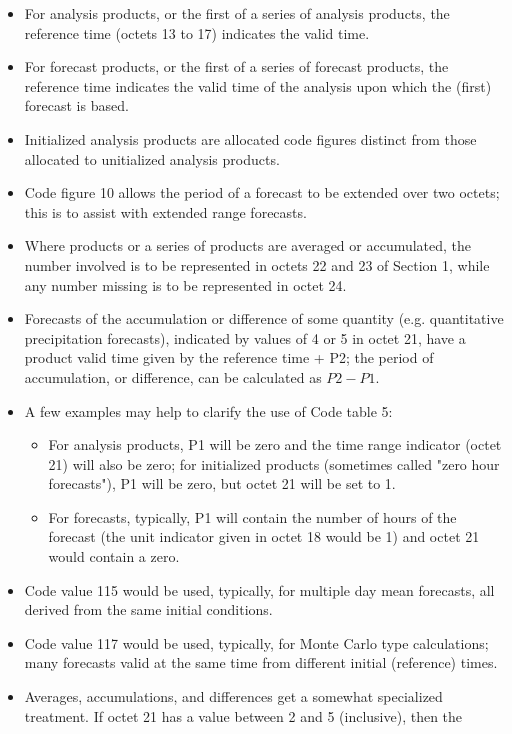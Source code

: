 \documentclass[draft,12pt,a4paper,twoside]{book}
\begin{document}
\begin{itemize}
\item For analysis products, or the first of a series of analysis products, the reference time (octets 13 to 17) indicates the valid time.
\item For forecast products, or the first of a series of forecast products, the reference time indicates the valid time of the analysis upon which the (first) forecast is based.
\item Initialized analysis products are allocated code figures distinct from those allocated to unitialized analysis products.
\item Code figure 10 allows the period of a forecast to be extended over two octets; this is to assist with extended range forecasts.
\item Where products or a series of products are averaged or accumulated, the number involved is to be represented in octets 22 and 23 of Section 1, while any number missing is to be represented in octet 24.
\item Forecasts of the accumulation or difference of some quantity (e.g. quantitative precipitation forecasts), indicated by values of 4 or 5 in octet 21, have a product valid time given by the reference time + P2; the period of accumulation, or difference, can be calculated as $P2 - P1$.
\item A few examples may help to clarify the use of Code table 5:
  \begin{itemize}
  \item For analysis products, P1 will be zero and the time range indicator
	(octet 21) will also be zero; for initialized products (sometimes
	called "zero hour forecasts"), P1 will be zero, but octet 21 will be
	set to 1.
  \item For forecasts, typically, P1  will contain the number of hours of the
	forecast (the unit indicator given in octet 18 would be 1) and octet 21
	would contain a zero.
  \end{itemize}
\item Code value 115 would be used, typically, for multiple day mean forecasts,
      all derived from the same initial conditions.
\item Code value 117 would be used, typically, for Monte Carlo type
      calculations; many forecasts valid at the same time from different
      initial (reference) times.
\item Averages, accumulations, and differences get a somewhat specialized
      treatment. If octet 21 has a value between 2 and 5 (inclusive), then the

\end{itemize}
\end{document}
